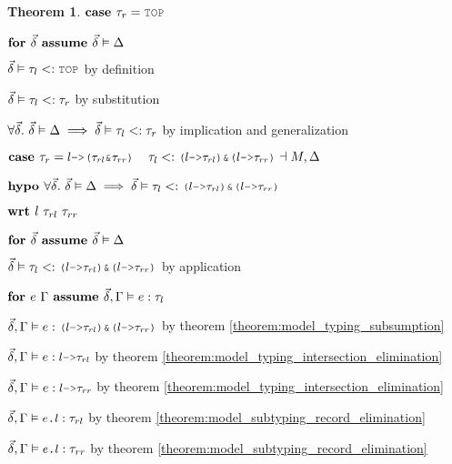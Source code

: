 \documentclass[acmsmall]{acmart}
\theoremstyle{definition}
\newtheorem{theorem}{Theorem}[section]
\begin{document}
\begin{theorem}
    \item \Z $\B{case } \tau_r = \J{TOP}$
      \item \Z\Z $\textbf{for } \vec{\delta} \textbf{ assume } \vec{\delta} \vDash \Delta$
        \item \Z\Z\Z $\vec{\delta} \satisfies \tau_l \subtypes \J{TOP}$ by definition
        \item \Z\Z\Z $\vec{\delta} \vDash \tau_l <: \tau_r$ by substitution 
      \item \Z\Z $\forall \vec{\delta} .\ \vec{\delta} \vDash \Delta \implies \vec{\delta} \vDash \tau_l <: \tau_r$ 
      by implication and generalization 

    \item \Z $\B{case } 
      \tau_r = \J{$l$->($\tau_{rl}$\&$\tau_{rr}$)}
      \I
      \tau_l
      \subtypes
      \J{($l$->$\tau_{rl}$)\&($l$->$\tau_{rr}$)}
      \given M, \Delta
    $
    \item \Z $\B{hypo }
      \forall \vec{\delta} .\ 
      \vec{\delta} \satisfies \Delta
      \implies
      \vec{\delta} \satisfies \tau_l \subtypes \J{($l$->$\tau_{rl}$)\&($l$->$\tau_{rr}$)}
    $ 
    \item \Z $\B{wrt } l\ \tau_{rl}\ \tau_{rr}$ 
      \item \Z\Z $\textbf{for } \vec{\delta} \textbf{ assume } \vec{\delta} \vDash \Delta$
        \item \Z\Z\Z $\vec{\delta} \satisfies \tau_l \subtypes \J{($l$->$\tau_{rl}$)\&($l$->$\tau_{rr}$)}$
        by application
        \item \Z\Z\Z $\textbf{for } e\ \Gamma \textbf{ assume } \vec{\delta}, \Gamma \vDash e : \tau_l$ 
          \item \Z\Z\Z\Z $\vec{\delta}, \Gamma \satisfies e \hastype \J{($l$->$\tau_{rl}$)\&($l$->$\tau_{rr}$)}$
          by theorem \ref{theorem:model_typing_subsumption} 
          \item \Z\Z\Z\Z $\vec{\delta}, \Gamma \satisfies e \hastype \J{$l$->$\tau_{rl}$}$ by theorem \ref{theorem:model_typing_intersection_elimination}
          \item \Z\Z\Z\Z $\vec{\delta}, \Gamma \satisfies e \hastype \J{$l$->$\tau_{rr}$}$ by theorem \ref{theorem:model_typing_intersection_elimination}
          \item \Z\Z\Z\Z $\vec{\delta}, \Gamma \satisfies \J{$e$.$l$} \hastype \tau_{rl}$ by theorem \ref{theorem:model_subtyping_record_elimination}
          \item \Z\Z\Z\Z $\vec{\delta}, \Gamma \satisfies \J{$e$.$l$} \hastype \tau_{rr}$ by theorem \ref{theorem:model_subtyping_record_elimination}

\end{theorem}
\end{document}
